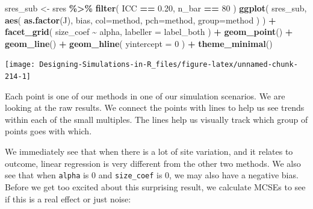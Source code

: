 \documentclass[
]{book}
\newenvironment{Shaded}{\begin{snugshade}}{\end{snugshade}}
\newcommand{\AttributeTok}[1]{\textcolor[rgb]{0.13,0.29,0.53}{#1}}
\newcommand{\DecValTok}[1]{\textcolor[rgb]{0.00,0.00,0.81}{#1}}
\newcommand{\FloatTok}[1]{\textcolor[rgb]{0.00,0.00,0.81}{#1}}
\newcommand{\FunctionTok}[1]{\textcolor[rgb]{0.13,0.29,0.53}{\textbf{#1}}}
\newcommand{\NormalTok}[1]{#1}
\newcommand{\OtherTok}[1]{\textcolor[rgb]{0.56,0.35,0.01}{#1}}
\newcommand{\SpecialCharTok}[1]{\textcolor[rgb]{0.81,0.36,0.00}{\textbf{#1}}}
\begin{document}
\begin{Shaded}
\begin{Highlighting}[]
\NormalTok{sres\_sub }\OtherTok{\textless{}{-}}\NormalTok{ sres }\SpecialCharTok{\%\textgreater{}\%}
  \FunctionTok{filter}\NormalTok{( ICC }\SpecialCharTok{==} \FloatTok{0.20}\NormalTok{, n\_bar }\SpecialCharTok{==} \DecValTok{80}\NormalTok{ )}
\FunctionTok{ggplot}\NormalTok{( sres\_sub, }\FunctionTok{aes}\NormalTok{( }\FunctionTok{as.factor}\NormalTok{(J), bias, }
                       \AttributeTok{col=}\NormalTok{method, }\AttributeTok{pch=}\NormalTok{method, }\AttributeTok{group=}\NormalTok{method ) ) }\SpecialCharTok{+}
  \FunctionTok{facet\_grid}\NormalTok{( size\_coef }\SpecialCharTok{\textasciitilde{}}\NormalTok{ alpha, }\AttributeTok{labeller =}\NormalTok{ label\_both ) }\SpecialCharTok{+}
  \FunctionTok{geom\_point}\NormalTok{() }\SpecialCharTok{+} \FunctionTok{geom\_line}\NormalTok{() }\SpecialCharTok{+}
  \FunctionTok{geom\_hline}\NormalTok{( }\AttributeTok{yintercept =} \DecValTok{0}\NormalTok{ ) }\SpecialCharTok{+}
  \FunctionTok{theme\_minimal}\NormalTok{() }
\end{Highlighting}
\end{Shaded}

\begin{center}\texttt{[image: Designing-Simulations-in-R\_files/figure-latex/unnamed-chunk-214-1]} \end{center}

Each point is one of our methods in one of our simulation scenarios.
We are looking at the raw results.
We connect the points with lines to help us see trends within each of the small multiples.
The lines help us visually track which group of points goes with which.

We immediately see that when there is a lot of site variation, and it relates to outcome, linear regression is very different from the other two methods.
We also see that when \texttt{alpha} is 0 and \texttt{size\_coef} is 0, we may also have a negative bias.
Before we get too excited about this surprising result, we calculate MCSEs to see if this is a real effect or just noise:
\end{document}
